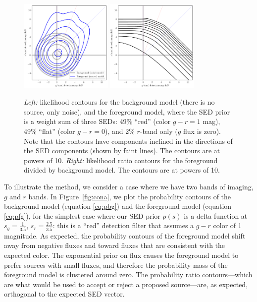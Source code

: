 \documentclass[letterpaper,preprint]{aastex62}
\newcommand{\figref}[1]{\mbox{Figure~\ref{#1}}}
\begin{document}
\begin{figure}
    \begin{center}
    \includegraphics[width=0.4\textwidth]{prob-contours-b}
    \includegraphics[width=0.4\textwidth]{prob-rel-b}
    \caption{ \emph{Left:} likelihood contours for the background
      model (there is no source, only noise), and the foreground
      model, where the SED prior is a weight sum of three SEDs: 49\%
      ``red'' (color $g-r=1$ mag), 49\% ``flat'' (color $g-r=0$), and
      2\% $r$-band only ($g$ flux is zero).  Note that the contours
      have components inclined in the directions of the SED components
      (shown by faint lines).  The contours are at powers of 10.
      \emph{Right:} likelihood ratio contours for the foreground
      divided by background model.  The contours are at powers of 10.
      \label{fig:conb}
    }
    \end{center}
\end{figure}

To illustrate the method, we consider a case where we have two bands
of imaging, $g$ and $r$ bands.  In \figref{fig:cona}, we plot the
probability contours of the background model (equation \ref{eq:pbg})
and the foreground model (equation \ref{eq:pfg}), for the simplest
case where our SED prior $p(s)$ is a delta function at $s_{g} =
\frac{1}{3.5}$, $s_{r} = \frac{2.5}{3.5}$: this is a ``red'' detection
filter that assumes a $g - r$ color of 1 magnitude.  As expected, the
probability contours of the foreground model shift away from negative
fluxes and toward fluxes that are consistent with the expected color.
The exponential prior on flux causes the foreground model to prefer
sources with small fluxes, and therefore the probability mass of the
foreground model is clustered around zero.  The probability ratio
contours---which are what would be used to accept or reject a proposed
source---are, as expected, orthogonal to the expected SED vector.
\end{document}
